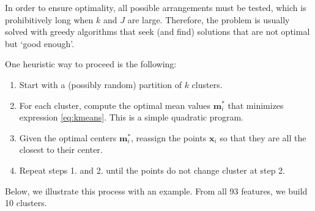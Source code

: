 \documentclass[]{krantz}
\makeatletter
\newenvironment{Shaded}{\begin{snugshade}}{\end{snugshade}}
\newcommand{\CommentTok}[1]{\textcolor[rgb]{0.37,0.37,0.37}{\textit{#1}}}
\newcommand{\DataTypeTok}[1]{\textcolor[rgb]{0.27,0.27,0.27}{#1}}
\newcommand{\DecValTok}[1]{\textcolor[rgb]{0.06,0.06,0.06}{#1}}
\newcommand{\KeywordTok}[1]{\textcolor[rgb]{0.27,0.27,0.27}{\textbf{#1}}}
\newcommand{\NormalTok}[1]{#1}
\newcommand{\OperatorTok}[1]{\textcolor[rgb]{0.43,0.43,0.43}{\textbf{#1}}}
\newcommand{\StringTok}[1]{\textcolor[rgb]{0.5,0.5,0.5}{#1}}
\providecommand{\tightlist}{%
  \setlength{\itemsep}{0pt}\setlength{\parskip}{0pt}}
\newenvironment{kframe}{%
\medskip{}
\setlength{\fboxsep}{.8em}
 \def\at@end@of@kframe{}%
 \ifinner\ifhmode%
  \def\at@end@of@kframe{\end{minipage}}%
  \begin{minipage}{\columnwidth}%
 \fi\fi%
 \def\FrameCommand##1{\hskip\@totalleftmargin \hskip-\fboxsep
 \colorbox{shadecolor}{##1}\hskip-\fboxsep
     \hskip-\linewidth \hskip-\@totalleftmargin \hskip\columnwidth}%
 \MakeFramed {\advance\hsize-\width
   \@totalleftmargin\z@ \linewidth\hsize
   \@setminipage}}%
 {\par\unskip\endMakeFramed%
 \at@end@of@kframe}
\renewenvironment{Shaded}{\begin{kframe}}{\end{kframe}}
\theoremstyle{definition}
\theoremstyle{definition}
\theoremstyle{definition}
\theoremstyle{remark}
\makeatother
\begin{document}
In order to ensure optimality, all possible arrangements must be tested,
which is prohibitively long when \(k\) and \(J\) are large. Therefore,
the problem is usually solved with greedy algorithms that seek (and
find) solutions that are not optimal but `good enough'.

One heuristic way to proceed is the following:

\begin{enumerate}
\def\labelenumi{\arabic{enumi}.}
\setcounter{enumi}{-1}
\tightlist
\item
  Start with a (possibly random) partition of \(k\) clusters.\\
\item
  For each cluster, compute the optimal mean values \(\textbf{m}_i^*\)
  that minimizes expression \eqref{eq:kmeans}. This is a simple quadratic
  program.\\
\item
  Given the optimal centers \(\textbf{m}_i^*\), reassign the points
  \(\textbf{x}_i\) so that they are all the closest to their center.\\
\item
  Repeat steps 1. and 2. until the points do not change cluster at step
  2.
\end{enumerate}

Below, we illustrate this process with an example. From all 93 features,
we build 10 clusters.

\footnotesize

\begin{Shaded}
\end{Shaded}
\end{document}
